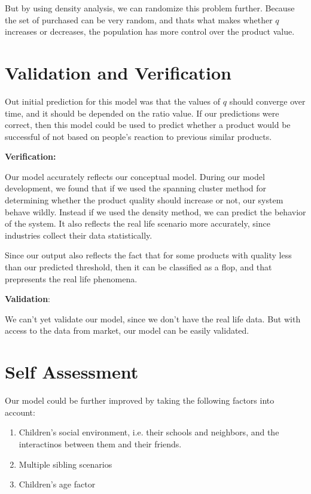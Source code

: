 \documentclass[article, 11pt, a4paper, onesize]{memoir}
\begin{document}
But by using density analysis, we can randomize this problem further. Because the set of
purchased can be very random, and thats what makes whether \(q\) increases or decreases,
the population has more control over the product value.


\section{Validation and Verification}

Out initial prediction for this model was that the values of \(q\) should converge over
time, and it should be depended on the ratio value. If our predictions were correct, then
this model could be used to predict whether a product would be successful of not based on
people's reaction to previous similar products. 

\textbf{Verification:}

Our model accurately reflects our conceptual model. During our model development, we found
that if we used the spanning cluster method for determining whether the product quality
should increase or not, our system behave wildly. Instead if we used the density method,
we can predict the behavior of the system. It also reflects the real life scenario more
accurately, since industries collect their data statistically. 

Since our output also reflects the fact that for some products with quality less than our
predicted threshold, then it can be classified as a flop, and that prepresents the real
life phenomena.

\textbf{Validation}:

We can't yet validate our model, since we don't have the real life data. But with access
to the data from market, our model can be easily validated.




\section{Self Assessment}

Our model could be further improved by taking the following factors into account:

\begin{enumerate}
    \item Children's social environment, i.e. their schools and neighbors, and the
        interactinos between them and their friends.
    \item Multiple sibling scenarios
    \item Children's age factor
\end{enumerate}
\end{document}
